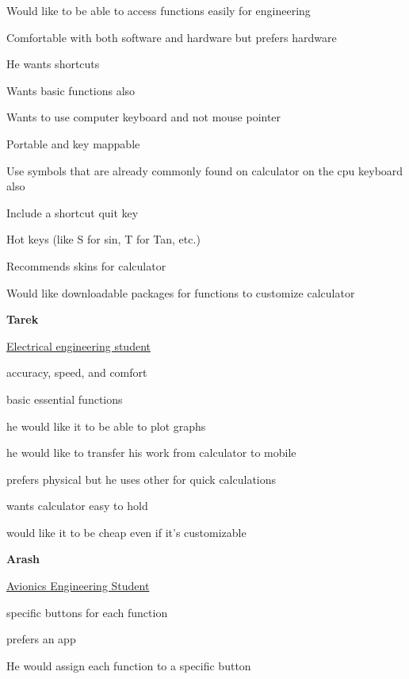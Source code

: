 \documentclass{article}
\begin{document}
\begin{compactitem}
\item Would like to be able to access functions easily for engineering 
\item Comfortable with both software and hardware but prefers hardware
\item He wants shortcuts
\item Wants basic functions also
\item Wants to use computer keyboard and not mouse pointer
\item Portable and key mappable
\item Use symbols that are already commonly found on calculator on the cpu keyboard also 
\item Include a shortcut quit key
\item Hot keys (like S for sin, T for Tan, etc.)
\item Recommends skins for calculator
\item Would like downloadable packages for functions to customize calculator
\end{compactitem}
\bigskip

\textbf{Tarek}

\underline{Electrical engineering student}

\begin{compactitem}
\item accuracy, speed, and comfort
\item basic essential functions
\item he would like it to be able to plot graphs 
\item he would like to transfer his work from calculator to mobile
\item prefers physical but he uses other for quick calculations
\item wants calculator easy to hold
\item would like it to be cheap even if it’s customizable
\end{compactitem}
\bigskip

\textbf{Arash}

\underline{Avionics Engineering Student}

\begin{compactitem}
\item specific buttons for each function
\item prefers an app 
\item He would assign each function to a specific button
\end{compactitem}
\end{document}

